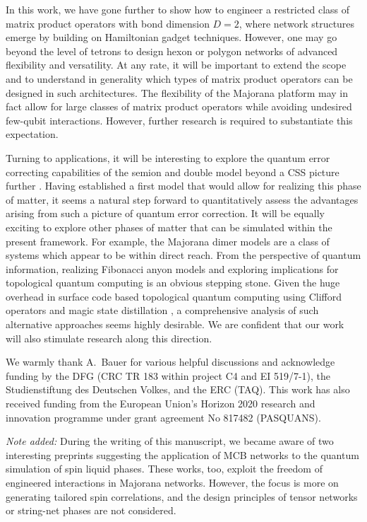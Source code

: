 \documentclass[twocolumn,floats,prx,showpacs]{revtex4-1}
\begin{document}
In this work, we have gone further to show how to engineer a restricted class of matrix product operators with bond dimension $D=2$, where network structures emerge by building on Hamiltonian gadget techniques. However, one may go beyond the level of tetrons to design hexon or polygon networks of advanced flexibility and versatility.  At any rate, it will be important to extend the scope and to understand in generality  which types of matrix product operators can be designed in such architectures. The flexibility of the Majorana platform may in fact allow for large classes of matrix product operators while  avoiding undesired few-qubit interactions.  However, further research is required to substantiate this expectation. 

Turning to applications, it will be interesting to explore the quantum error correcting capabilities of the semion and double model
beyond a CSS picture further \cite{SemionErrorCorrection}. Having established a first model that would allow for realizing this phase of matter,
it seems a natural step forward to quantitatively assess the advantages arising from such a picture of quantum error correction. 
It will be equally exciting  to explore other phases of matter that can be simulated within the 
present framework. For example, the Majorana dimer models \cite{PhysRevB.94.115115,PhysRevB.94.115127} are a class of systems which appear to be within direct reach.
From the perspective of quantum information, realizing
Fibonacci anyon models \cite{Levin2005}  and exploring  implications 
for topological quantum computing is an obvious stepping stone. Given the huge overhead in surface code based topological quantum computing using Clifford operators and magic state distillation \cite{PhysRevA.71.022316}, 
a comprehensive analysis of such alternative approaches seems highly desirable. 
We are confident that our work will also stimulate research along this direction.

\begin{acknowledgements}
We warmly thank A.\ Bauer for various helpful discussions and acknowledge funding by the DFG (CRC TR 183 within project C4 and EI 519/7-1),
the Studienstiftung des Deutschen Volkes, and the ERC (TAQ). This work has also received funding from the European Union's Horizon 2020 research and innovation 
programme under grant agreement No 817482 (PASQUANS). 

\emph{Note added:}  During the writing of this manuscript, we became aware of two  interesting preprints
\cite{Sagi2018,Thomson2018}  suggesting the application of  MCB networks  to the quantum simulation 
of spin liquid phases. These works, too, exploit the freedom of  engineered  
interactions in Majorana networks. However, the focus is more on generating tailored spin correlations,  and the design principles of tensor networks  or string-net phases are not considered.  
\end{acknowledgements}
\end{document}

